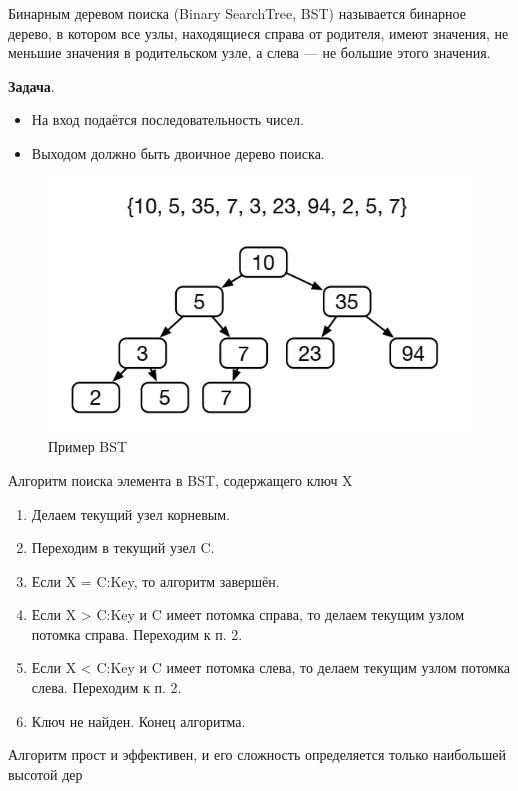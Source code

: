 \documentclass{beamer}
\begin{document}
\begin{frame}[t]
	\begin{block}{Бинарным деревом поиска (Binary SearchTree, BST)}
		 называется бинарное дерево, в котором все узлы, находящиеся справа от родителя, имеют значения, не меньшие значения в родительском узле, а слева — не большие этого значения. 
	\end{block}	
	\textbf{Задача}. 
	\begin{itemize}
		\item На вход подаётся последовательность чисел. 
		\item Выходом должно быть двоичное дерево поиска.
	\end{itemize}	
	\begin{figure}[h]
		\centering
		\includegraphics[scale=0.5]{images/lec07-pic03.png}
		\caption{Пример BST}
	\end{figure}
\end{frame}	

\begin{frame}{Алгоритм поиска элемента в BST, содержащего ключ X}
	\begin{enumerate}
		\item Делаем текущий узел корневым.
		\item Переходим в текущий узел C.
		\item Если X = C:Key, то алгоритм завершён.
		\item Если X > C:Key и C имеет потомка справа, то делаем текущим узлом потомка справа. Переходим к п. 2.
		\item Если X < C:Key и C имеет потомка слева, то делаем текущим узлом потомка слева. Переходим к п. 2.
		\item Ключ не найден. Конец алгоритма.	
	\end{enumerate}
	Алгоритм прост и эффективен, и его сложность определяется только наибольшей высотой дер
\end{frame}	
\end{document}

